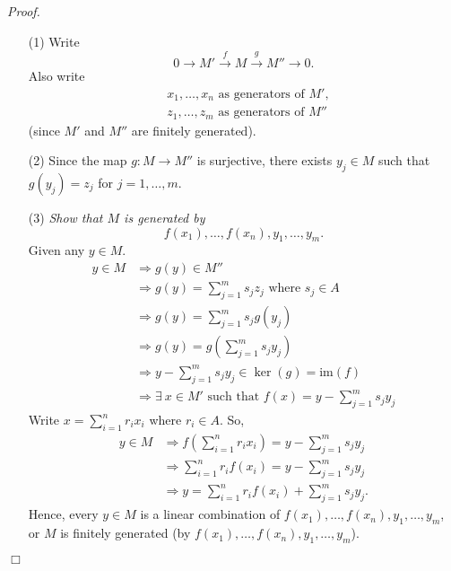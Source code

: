 \documentclass{article}
\begin{document}
\emph{Proof.}
\begin{enumerate}
\item[(1)]
  Write
  \[
    0 \to M' \xrightarrow{f} M \xrightarrow{g} M'' \to 0.
  \]
  Also write
  \begin{align*}
    &x_1, \ldots, x_n \text{ as generators of } M', \\
    &z_1, \ldots, z_m \text{ as generators of } M''
  \end{align*}
  (since $M'$ and $M''$ are finitely generated).

\item[(2)]
  Since the map $g: M \to M''$ is surjective,
  there exists $y_j \in M$ such that $g(y_j) = z_j$ for $j = 1, \ldots, m$.

\item[(3)]
  \emph{Show that $M$ is generated by}
  \[
    f(x_1), \ldots, f(x_n), y_1, \ldots, y_m.
  \]
  Given any $y \in M$.
  \begin{align*}
    y \in M
    &\Longrightarrow g(y) \in M'' \\
    &\Longrightarrow g(y) = \sum_{j=1}^{m} s_j z_j \text{ where } s_j \in A \\
    &\Longrightarrow g(y) = \sum_{j=1}^{m} s_j g(y_j) \\
    &\Longrightarrow g(y) = g\left( \sum_{j=1}^{m} s_j y_j \right) \\
    &\Longrightarrow y - \sum_{j=1}^{m} s_j y_j \in \ker(g) = \text{im}(f) \\
    &\Longrightarrow \exists \: x \in M' \text{ such that } f(x) = y - \sum_{j=1}^{m} s_j y_j
  \end{align*}
  Write $x = \sum_{i=1}^{n} r_i x_i$ where $r_i \in A$.
  So,
  \begin{align*}
    y \in M
    &\Longrightarrow f\left( \sum_{i=1}^{n} r_i x_i \right) = y - \sum_{j=1}^{m} s_j y_j \\
    &\Longrightarrow \sum_{i=1}^{n} r_i f(x_i) = y - \sum_{j=1}^{m} s_j y_j \\
    &\Longrightarrow y = \sum_{i=1}^{n} r_i f(x_i) + \sum_{j=1}^{m} s_j y_j.
  \end{align*}
  Hence, every $y \in M$ is a linear combination of
  $f(x_1), \ldots, f(x_n), y_1, \ldots, y_m$,
  or $M$ is finitely generated
  (by $f(x_1), \ldots, f(x_n), y_1, \ldots, y_m$).
\end{enumerate}
$\Box$ \\\\



\end{document}
